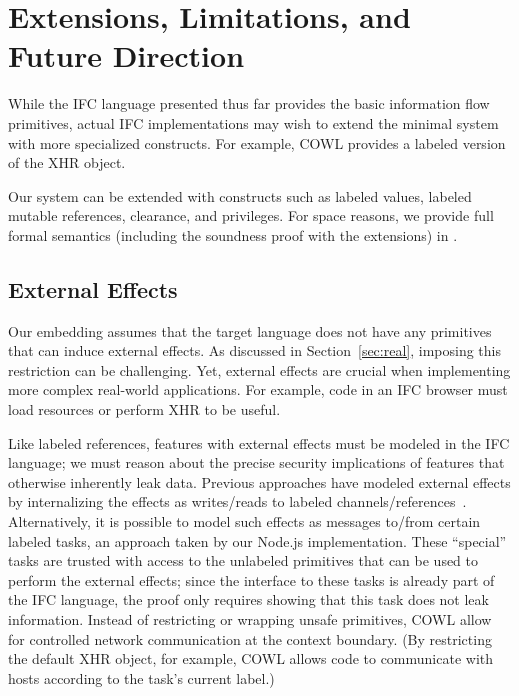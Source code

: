 
\section{Extensions, Limitations, and Future Direction}
\label{sec:extensions}
\label{sec:extensions:labeled}

While the IFC language presented thus far provides the basic
information flow primitives, actual IFC implementations
may wish to extend the minimal system with more specialized
constructs.
For example, COWL provides a labeled version of the XHR object.

Our system can be extended with constructs such as labeled values,
labeled mutable references, clearance, and privileges.
For space reasons, we provide full formal semantics (including the soundness
proof with the extensions) in \appendixextfirst{}.


\subsection{External Effects}
\label{sec:extensions:external}
Our embedding assumes that the target language does not have any
primitives that can induce external effects.
%
As discussed in Section~\ref{sec:real}, imposing this restriction
can be challenging.
%
Yet, external effects are crucial when implementing more complex
real-world applications.
%
For example, code in an IFC browser must load resources or
perform XHR to be useful.

Like labeled references, features with external effects must be
modeled in the IFC language; we must reason about the precise security
implications of features that otherwise inherently leak data.
%
Previous approaches have modeled external effects by internalizing the
effects as writes/reads to labeled channels/references~\cite{stefan:addressing-covert}.
%
Alternatively, it is possible to model such effects as messages to/from
certain labeled tasks, an approach taken by our Node.js
implementation.
%
These ``special'' tasks are trusted with access to the unlabeled
primitives that can be used to perform the external effects; since the
interface to these tasks is already part of the IFC language, the
proof only requires showing that this task does not leak information.
%
Instead of restricting or wrapping unsafe primitives,
COWL allow for
controlled network communication at the context boundary.
%
(By restricting the default XHR object, for example, COWL allows code
to communicate with hosts according to the task's current label.)
